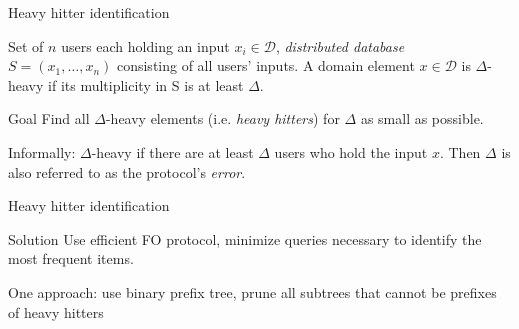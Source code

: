 \documentclass[aspectratio=43]{beamer}
\begin{document}

\begin{frame}{Heavy hitter identification}
    \begin{definition}
        Set of $n$ users each holding an input $x_i \in \mathcal{D}$, \emph{distributed database} $S = (x_1,\ldots,x_n)$ consisting of all users' inputs. A domain element $x \in \mathcal{D}$ is $\Delta$-heavy if its multiplicity in S is at least $\Delta$.
    \end{definition}
    \begin{alertblock}{Goal}
        Find all $\Delta$-heavy elements (i.e. \emph{heavy hitters}) for $\Delta$ as small as possible.
    \end{alertblock}
    \bigskip
    Informally: $\Delta$-heavy if there are at least $\Delta$ users who hold the input $x$. Then $\Delta$ is also referred to as the protocol's \emph{error}.\\ 
\end{frame}


\begin{frame}{Heavy hitter identification}
    \begin{exampleblock}{Solution} Use efficient FO protocol, minimize queries necessary to identify the most frequent items.
    \end{exampleblock}
    \bigskip
    One approach: use binary prefix tree, prune all subtrees that cannot be prefixes of heavy hitters
\end{frame}

%
%
\end{document}
